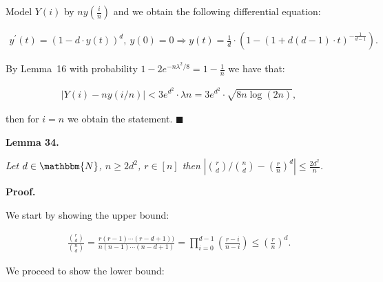 Model $Y(i)$ by $ny\left(\frac{i}{n}\right)$ and we obtain the following differential equation:\par


\[\begin{gathered}
\displaystyle y^{\prime}(t)=\left(1-d\cdot y(t)\right)^{d},\ y(0)=0\Rightarrow y(t)=\frac{1}{d}\cdot\left(1-\left(1+d(d-1)\cdot t\right)^{-\frac{1}{d-1}}\right).
\end{gathered}\]


By Lemma 16 with probability $1-2e^{-n\lambda^{2}/8}=1-\frac{1}{n}$ we have that:\par


\[\begin{gathered}
\displaystyle\bigl|Y(i)-ny(i/n)\bigr|<3e^{d^{2}}\cdot\lambda n=3e^{d^{2}}\cdot\sqrt{8n\log(2n)},
\end{gathered}\]


then for $i=n$ we obtain the statement.
\ensuremath{\blacksquare}\par






\par\medskip\noindent\textbf{\textbf{Lemma 34}\textbf{.}}\par



\emph{Let $d\in\mathbbm{N}$, $n\geq 2d^{2}$, $r\in[n]$
then $|\binom{r}{d}/\binom{n}{d}-\left(\frac{r}{n}\right)^{d}|\leq\frac{2d^{2}}{n}$.}\par






\par\medskip\noindent\textbf{Proof.}\par



We start by showing the upper bound:\par


\[\begin{gathered}
\displaystyle\frac{\binom{r}{d}}{\binom{n}{d}}=\frac{r(r-1)\cdots(r-d+1))}{n(n-1)\cdots(n-d+1)}=\prod_{i=0}^{d-1}\left(\frac{r-i}{n-i}\right)\leq\left(\frac{r}{n}\right)^{d}.
\end{gathered}\]


We proceed to show the lower bound:\par


